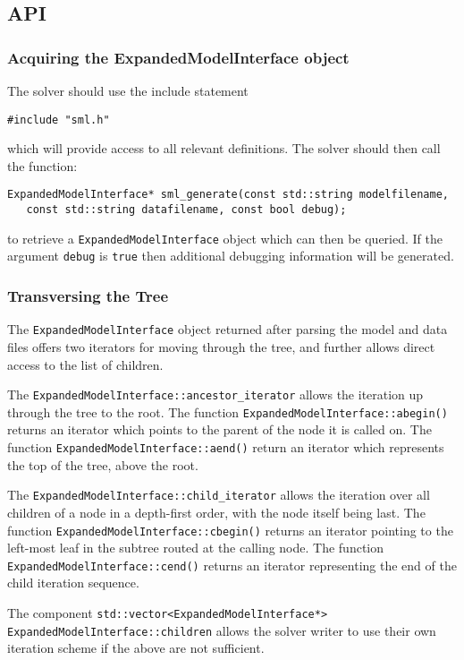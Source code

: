 \documentclass[10pt,a4paper]{book}
\begin{document}
\begin{verbtaim}
\subsection{API}

\subsubsection{Acquiring the ExpandedModelInterface object}
The solver should use the include statement
\begin{verbatim}
#include "sml.h"
\end{verbatim}
which will provide access to all relevant definitions. The solver should then
call the function:

\begin{verbatim}
ExpandedModelInterface* sml_generate(const std::string modelfilename, 
   const std::string datafilename, const bool debug);
\end{verbatim}

to retrieve a {\tt ExpandedModelInterface} object which can then be queried.
If the argument {\tt debug} is {\tt true} then additional debugging information
will be generated.

\subsubsection{Transversing the Tree}
The {\tt ExpandedModelInterface} object returned after parsing the model and
data files offers two iterators for moving through the tree, and further allows
direct access to the list of children.

The {\tt ExpandedModelInterface::ancestor\_iterator} allows the iteration up
through the tree to the root. The function
{\tt ExpandedModelInterface::abegin()} returns an
iterator which points to the parent of the node it is called on. The function
{\tt ExpandedModelInterface::aend()} return an iterator which represents the
top of the tree, above the root.

The {\tt ExpandedModelInterface::child\_iterator} allows the iteration over all
children of a node in a depth-first order, with the node itself being last. The
function {\tt ExpandedModelInterface::cbegin()} returns an iterator pointing to
the left-most leaf in the subtree routed at the calling node. The function 
{\tt ExpandedModelInterface::cend()} returns an iterator representing the end
of the child iteration sequence.

The component
{\tt std::vector<ExpandedModelInterface*> ExpandedModelInterface::children}
allows the solver writer to use their own iteration scheme if the above are not
sufficient.


\end{verbtaim}
\end{document}
